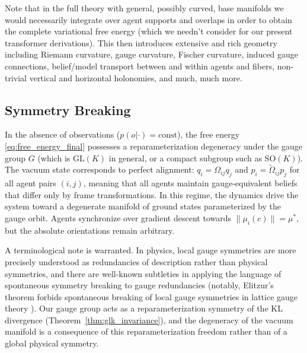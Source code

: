\documentclass[twoside,11pt]{article}
\begin{document}
Note that in the full theory with general, possibly curved, base manifolds we would necessarily integrate over agent supports and overlaps in order to obtain the complete variational free energy (which we needn't consider for our present transformer derivations). This then introduces extensive and rich geometry including Riemann curvature, gauge curvature, Fischer curvature, induced gauge connections, belief/model transport between and within agents and fibers, non-trivial vertical and horizontal holonomies, and much, much more.

\subsection{Symmetry Breaking}
\label{sec:symmetry_breaking}
In the absence of observations ($p(o|\cdot) = \text{const}$), the free energy \eqref{eq:free_energy_final} possesses a reparameterization degeneracy under the gauge group $G$ (which is $\mathrm{GL}(K)$ in general, or a compact subgroup such as $\mathrm{SO}(K)$). The vacuum state corresponds to perfect alignment: $q_i = \Omega_{ij}q_j$ and $p_i = \tilde{\Omega}_{ij}p_j$ for all agent pairs $(i,j)$, meaning that all agents maintain gauge-equivalent beliefs that differ only by frame transformations. In this regime, the dynamics drive the system toward a degenerate manifold of ground states parameterized by the gauge orbit. Agents synchronize over gradient descent towards $\|\mu_i(c)\| = \mu^*$, but the absolute orientations remain arbitrary.

A terminological note is warranted. In physics, local gauge symmetries are more precisely understood as redundancies of description rather than physical symmetries, and there are well-known subtleties in applying the language of spontaneous symmetry breaking to gauge redundancies (notably, Elitzur's theorem forbids spontaneous breaking of local gauge symmetries in lattice gauge theory \citep{weinberg1995quantum}). Our gauge group acts as a reparameterization symmetry of the KL divergence (Theorem~\ref{thm:glk_invariance}), and the degeneracy of the vacuum manifold is a consequence of this reparameterization freedom rather than of a global physical symmetry.
\end{document}
